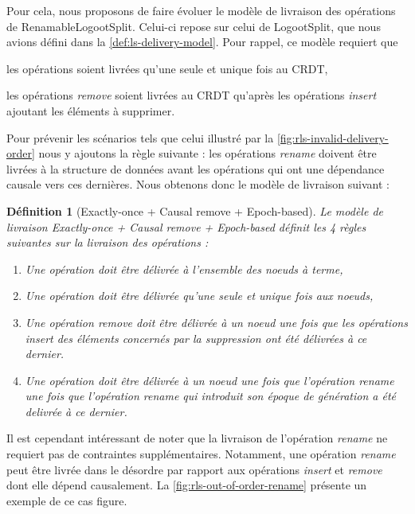 \documentclass[12pt]{thesul}
\newtheorem{definition}{Définition}
\begin{document}
Pour cela, nous proposons de faire évoluer le modèle de livraison des opérations de RenamableLogootSplit.
Celui-ci repose sur celui de LogootSplit, que nous avions défini dans la \autoref{def:ls-delivery-model}.
Pour rappel, ce modèle requiert que
\begin{enumerate*}[label=(\roman*)]
  \item les opérations soient livrées qu'une seule et unique fois au \ac{CRDT},
  \item les opérations \emph{remove} soient livrées au \ac{CRDT} qu'après les opérations \emph{insert} ajoutant les éléments à supprimer.
\end{enumerate*}

Pour prévenir les scénarios tels que celui illustré par la \autoref{fig:rls-invalid-delivery-order} nous y ajoutons la règle suivante : les opérations \emph{rename} doivent être livrées à la structure de données avant les opérations qui ont une dépendance causale vers ces dernières.
Nous obtenons donc le modèle de livraison suivant :

\begin{definition}[Exactly-once + Causal remove + Epoch-based]
  Le modèle de livraison \emph{Exactly-once + Causal remove + Epoch-based} définit les 4 règles suivantes sur la livraison des opérations :
  \begin{enumerate}
    \item Une opération doit être délivrée à l'ensemble des noeuds à terme,
    \item Une opération doit être délivrée qu'une seule et unique fois aux noeuds,
    \item Une opération \emph{remove} doit être délivrée à un noeud une fois que les opérations \emph{insert} des éléments concernés par la suppression ont été délivrées à ce dernier.
    \item Une opération doit être délivrée à un noeud une fois que l'opération \emph{rename} une fois que l'opération \emph{rename} qui introduit son époque de génération a été delivrée à ce dernier.
  \end{enumerate}
\end{definition}

Il est cependant intéressant de noter que la livraison de l'opération \emph{rename} ne requiert pas de contraintes supplémentaires.
Notamment, une opération \emph{rename} peut être livrée dans le désordre par rapport aux opérations \emph{insert} et \emph{remove} dont elle dépend causalement.
La \autoref{fig:rls-out-of-order-rename} présente un exemple de ce cas figure.
\end{document}
